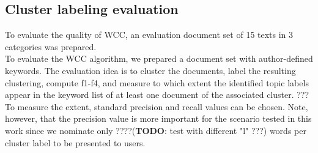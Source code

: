 \subsection{Cluster labeling evaluation}

To evaluate the quality of WCC, an evaluation document set of 15 texts in 3 categories was prepared. \\  

To evaluate the WCC algorithm, we prepared a document set with author-defined keywords. The evaluation idea is to cluster the documents, label the resulting clustering, compute f1-f4, and measure to which extent the identified topic labels appear in the keyword list of at least one document of the associated cluster. ??? \\
To measure the extent, standard precision and recall values can be chosen. Note, however, that the precision value is more important for the scenario tested in this work since we nominate only ????(\textbf{TODO}: test with different "l" ???) words per cluster label to be presented to users. \\



